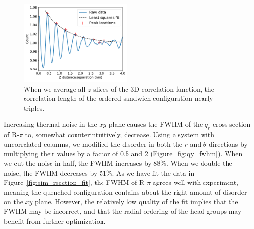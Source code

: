 \documentclass[journal=jpcbfk,manuscript=article]{achemso}
\begin{document}
  \begin{figure}
  \centering
  \includegraphics[width=0.5\textwidth]{z_correlation_fullbox.pdf}
  \caption{When we average all $z$-slices of the 3D correlation function, the 
  correlation length of the ordered sandwich configuration nearly triples.}\label{fig:z_correlation_fullbox}
  \end{figure}
 
  Increasing thermal noise in the $xy$ plane causes the FWHM of the $q_r$
  cross-section of R-$\pi$ to, somewhat counterintuitively, decrease. Using a 
  system with uncorrelated columns, we modified the disorder in both the $r$ and
  $\theta$ directions by multiplying their values by a factor of 0.5 and 2 
  (Figure~\ref{fig:qy_fwhm}). When we cut the noise in half, the FWHM increases
  by 88\%. When we double the noise, the FWHM decreases by 51\%. As we have fit
  the data in Figure~\ref{fig:sim_rsection_fit}, the FWHM of R-$\pi$ agrees
  well with experiment, meaning the quenched configuration contains about the
  right amount of disorder on the $xy$ plane. However, the relatively low quality
  of the fit implies that the FWHM may be incorrect, and that the radial ordering
  of the head groups may benefit from further optimization.
\end{document}
